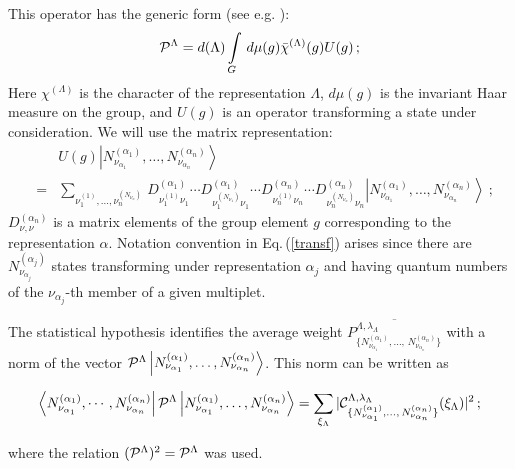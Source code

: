 \documentclass[a4paper,11pt]{article}
\begin{document}
This operator has the generic form (see e.g. \cite{Wigner}):
\begin{equation}\label{proj1}
{\cal
P}^{\Lambda}=d(\Lambda)\int\limits_G\,d\mu(g)\bar\chi^{(\Lambda)}(g)U(g)\,;
\end{equation}
Here $\chi^{(\Lambda)}$ is the character of the representation
$\Lambda$, $d\mu(g)$ is the invariant Haar measure on the group,
and $U(g)$ is an operator transforming a state under
consideration. We will use the matrix representation:
\begin{eqnarray}\label{transf}
& &U(g)\left\vert N^{(\alpha_1)}_{\nu_{\alpha_1}},\dots,
N^{(\alpha_n)}_{\nu_{\alpha_n}}\right\rangle \nonumber\\ &=
&\sum\limits_{\nu_1^{(1)},\dots,\nu_n^{(N_{\nu_n})}}\,
D^{(\alpha_1)}_{\nu_1^{(1)}\nu_1}\!\!\cdots
D^{(\alpha_1)}_{\nu_1^{(N_{\nu_1})}\nu_1}\!\!\cdots
D^{(\alpha_n)}_{\nu_n^{(1)}\nu_n}\!\!\cdots
D^{(\alpha_n)}_{\nu_n^{(N_{\nu_n})}\nu_n} \left\vert
N^{(\alpha_1)}_{\nu_{\alpha_1}},\dots,
N^{(\alpha_n)}_{\nu_{\alpha_n}}\right\rangle\ ;
\end{eqnarray}
$D^{(\alpha_n)}_{\nu,\nu}$ is a matrix elements of the group
element $g$ corresponding to the representation $\alpha$. Notation
convention in Eq.\,(\ref{transf}) arises since  there are
$N^{(\alpha_j)}_{\nu_{\alpha_j}}$ states transforming under
representation $\alpha_j$ and having quantum numbers of the
$\nu_{\alpha_j}$-th member of a given multiplet.

The statistical hypothesis identifies the average weight
$\overline{P^{\Lambda,\lambda_{\Lambda}}_{\{N^{(\alpha_1)}_{\nu_{\alpha_1}},
\dots,\,N^{(\alpha_n)}_{\nu_{\alpha_n}}\}}}$ with a norm of the
vector ${\cal P}^{\Lambda}\left\vert
N^{(\alpha_1)}_{\nu_{\alpha_1}},\dots,
N^{(\alpha_n)}_{\nu_{\alpha_n}}\right\rangle$. This norm can be
written as

\begin{eqnarray}\label{normP}
\left\langle N^{(\alpha_1)}_{\nu_{\alpha_1}},
\cdots,N^{(\alpha_n)}_{\nu_{\alpha_n}}\right\vert {\cal P
}^{\Lambda}\left\vert N^{(\alpha_1)}_{\nu_{\alpha_1}},\dots,
N^{(\alpha_n)}_{\nu_{\alpha_n}}\right\rangle =
\sum\limits_{\xi_\Lambda}\vert{\cal
C}^{\Lambda,\lambda_{\Lambda}}_{\{N^{(\alpha_1)}_{\nu_{\alpha_1}},
\dots,\,N^{(\alpha_n)}_{\nu_{\alpha_n}}\}}(\xi_\Lambda)\vert^2\,;
\end{eqnarray}

where the relation $({\cal P}^\Lambda)^2={\cal P}^\Lambda$ was
used.
\end{document}
